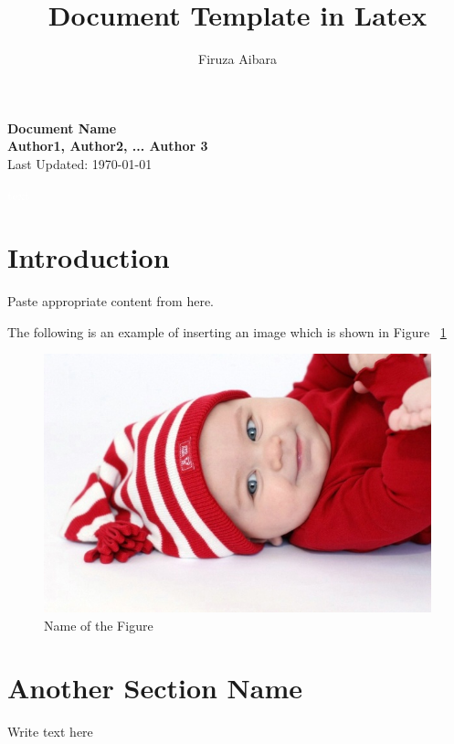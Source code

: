 \documentclass[12pt]{article}
\title{Document Template in Latex}
\author{Firuza Aibara}
\begin{document}
\begin{titlepage}
 \begin{center}
\Huge
\textbf{Document Name} \\
\vfill
\LARGE
\textbf{Author1, Author2, ... Author 3}\\
\vfill
\Large
Last Updated: \today
\end{center}
\end{titlepage}

 \pagebreak \textcolor{white}{text} \pagebreak
\thispagestyle{empty}

\pagebreak
\setcounter{page}{1}

\listoffigures

\pagebreak

\listoftables

\pagebreak

\tableofcontents

\pagebreak

\setcounter{page}{1}


\section{Introduction}
Paste appropriate content from here. 

The following is an example of inserting an image which is shown in Figure ~\ref{fig:Image1} 

\begin{figure}[hb]
 \centering
 \includegraphics[width=12cm]{./Image1.jpg}
 \caption{Name of the Figure\label{fig:Image1}}
\end{figure}

\section{Another Section Name}
Write text here
\end{document}
